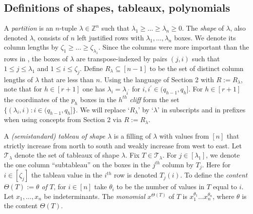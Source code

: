\documentclass[11pt]{article}
\theoremstyle{definition}
\theoremstyle{remark}
\numberwithin{equation}{section}
\begin{document}
\begin{spacing}{1.35}
\section{Definitions of shapes, tableaux, polynomials}

A \emph{partition} is an $n$-tuple $\lambda \in \mathbb{Z}^n$ such that $\lambda_1 \geq \ldots \geq \lambda_n \geq 0$.  The \textit{shape} of $\lambda$, also denoted $\lambda$, consists of $n$ left justified rows with $\lambda_1, \ldots, \lambda_n$ boxes.  We denote its column lengths by $\zeta_1 \geq \ldots \geq \zeta_{\lambda_1}$.  Since the columns were more important than the rows in \cite{PW}, the boxes of $\lambda$ are transpose-indexed by pairs $(j,i)$ such that $1 \leq j \leq \lambda_1$ and $1 \leq i \leq \zeta_j$.  Define $R_\lambda \subseteq [n-1]$ to be the set of distinct column lengths of $\lambda$ that are less than $n$.  Using the language of Section 2 with $R := R_\lambda$, note that for $h \in [r+1]$ one has $\lambda_i = \lambda_{i^\prime}$ for $i, i^\prime \in (q_{h-1}, q_{h} ]$.  For $h \in [r+1]$ the coordinates of the $p_h$ boxes in the $h^{th}$ \emph{cliff} form the set $\{ (\lambda_i, i) : i \in (q_{h-1}, q_{h} ] \}$.  We will replace `$R_\lambda$' by `$\lambda$' in subscripts and in prefixes when using concepts from Section 2 via $R := R_\lambda$.



A \textit{(semistandard) tableau of shape $\lambda$} is a filling of $\lambda$ with values from $[n]$ that strictly increase from north to south and weakly increase from west to east.  Let $\mathcal{T}_\lambda$ denote the set of tableaux of shape $\lambda$.  Fix $T \in \mathcal{T}_\lambda$.  For $j \in [\lambda_1]$, we denote the one column ``subtableau'' on the boxes in the $j^{th}$ column by $T_j$.  Here for $i \in [\zeta_j]$ the tableau value in the $i^{th}$ row is denoted $T_j(i)$.  To define the \emph{content $\Theta(T) := \theta$ of $T$}, for $i \in [n]$ take $\theta_i$ to be the number of values in $T$ equal to $i$.  Let $x_1,\ldots, x_n$ be indeterminants.  The \textit{monomial} $x^{\Theta(T)}$ of $T$ is $x_1^{\theta_1}\ldots x_n^{\theta_n}$, where $\theta$ is the content $\Theta(T)$.




\end{spacing}
\end{document}

